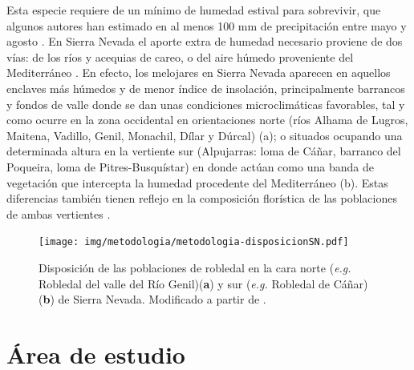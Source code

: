 Esta especie requiere de un mínimo de humedad estival para sobrevivir, que algunos autores han estimado en al menos 100 mm de precipitación entre mayo y agosto \autocite{BlancoCastroetal2005BosquesIbericos, Prieto1975BosquesSierra}. En Sierra Nevada el aporte extra de humedad necesario proviene de dos vías: de los ríos y acequias de careo, o del aire húmedo proveniente del Mediterráneo \autocites{PrietoEspinosa1977AestisilvaSierra, MartinezParrasMoleroMesa1982EcologiaFitosociologia,PerezRayaetal1990VegetacionSierra}. En efecto, los melojares en Sierra Nevada aparecen en aquellos enclaves más húmedos y de menor índice de insolación, principalmente barrancos y fondos de valle donde se dan unas condiciones microclimáticas favorables, tal y como ocurre en la zona occidental en orientaciones norte (ríos Alhama de Lugros, Maitena, Vadillo, Genil, Monachil, Dílar y Dúrcal) (a); o situados ocupando una determinada altura en la vertiente sur (Alpujarras: loma de Cáñar, barranco del Poqueira, loma de Pitres-Busquístar) en donde actúan como una banda de vegetación que intercepta la humedad procedente del Mediterráneo \autocites{Lorite2001VegetacionSierra,PrietoEspinosa1977AestisilvaSierra} (b). Estas diferencias también tienen reflejo en la composición florística de las poblaciones de ambas vertientes \autocites{Loriteetal2008PhytosociologicalReview,MelendoValle2000EstudioComparativo}.  

\begin{figure}
	\centering
	\texttt{[image: img/metodologia/metodologia-disposicionSN.pdf]}\caption{Disposición de las poblaciones de robledal en la cara norte (\emph{e.g.} Robledal del valle del Río Genil)(\textbf{a}) y sur (\emph{e.g.} Robledal de Cáñar)(\textbf{b}) de Sierra Nevada. Modificado a partir de \citet{PrietoEspinosa1977AestisilvaSierra}.} \label{fig:metodologia:disposicion}
\end{figure}

\section{Área de estudio}
\label{sec:metodologia:sn}

